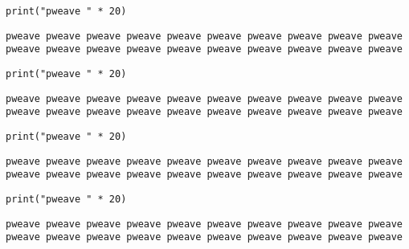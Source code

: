 \begin{verbatim}
print("pweave " * 20)
\end{verbatim}
\begin{verbatim}
pweave pweave pweave pweave pweave pweave pweave pweave pweave pweave
pweave pweave pweave pweave pweave pweave pweave pweave pweave pweave

\end{verbatim}



\begin{verbatim}
print("pweave " * 20)
\end{verbatim}
\begin{verbatim}
pweave pweave pweave pweave pweave pweave pweave pweave pweave pweave pweave pweave pweave pweave pweave pweave pweave pweave pweave pweave 
\end{verbatim}



\begin{verbatim}
print("pweave " * 20)

\end{verbatim}
\begin{verbatim}
pweave pweave pweave pweave pweave pweave pweave pweave pweave pweave
pweave pweave pweave pweave pweave pweave pweave pweave pweave pweave

\end{verbatim}



\begin{verbatim}
print("pweave " * 20)
\end{verbatim}
\begin{verbatim}
pweave pweave pweave pweave pweave pweave pweave pweave pweave pweave
pweave pweave pweave pweave pweave pweave pweave pweave pweave pweave


\end{verbatim}

